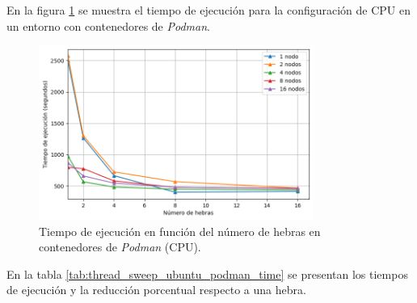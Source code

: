 En la figura \ref{fig:thread_sweep_ubuntu_podman_time} se muestra el tiempo de ejecución para la configuración de CPU en un entorno con contenedores de \textit{Podman}.

\begin{figure}[H]
    \centering
    \includegraphics[width=0.8\textwidth]{imagenes/cap5/thread_sweep_ubuntu_podman_time.png}
    \caption{Tiempo de ejecución en función del número de hebras en contenedores de \textit{Podman} (CPU).}
    \label{fig:thread_sweep_ubuntu_podman_time}
\end{figure}

En la tabla \ref{tab:thread_sweep_ubuntu_podman_time} se presentan los tiempos de ejecución y la reducción porcentual respecto a una hebra.

